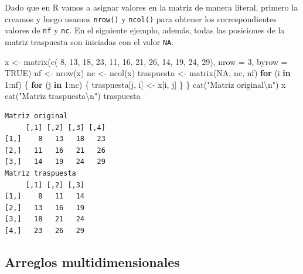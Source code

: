 \documentclass[
]{book}
\newenvironment{Shaded}{\begin{snugshade}}{\end{snugshade}}
\newcommand{\AttributeTok}[1]{\textcolor[rgb]{0.77,0.63,0.00}{#1}}
\newcommand{\ConstantTok}[1]{\textcolor[rgb]{0.00,0.00,0.00}{#1}}
\newcommand{\ControlFlowTok}[1]{\textcolor[rgb]{0.13,0.29,0.53}{\textbf{#1}}}
\newcommand{\DecValTok}[1]{\textcolor[rgb]{0.00,0.00,0.81}{#1}}
\newcommand{\FunctionTok}[1]{\textcolor[rgb]{0.00,0.00,0.00}{#1}}
\newcommand{\NormalTok}[1]{#1}
\newcommand{\OtherTok}[1]{\textcolor[rgb]{0.56,0.35,0.01}{#1}}
\newcommand{\SpecialCharTok}[1]{\textcolor[rgb]{0.00,0.00,0.00}{#1}}
\newcommand{\StringTok}[1]{\textcolor[rgb]{0.31,0.60,0.02}{#1}}
\begin{document}
Dado que en R vamos a asignar valores en la matriz de manera literal, primero la creamos y luego usamos \texttt{nrow()} y \texttt{ncol()} para obtener los correspondientes valores de \texttt{nf} y \texttt{nc}. En el siguiente ejemplo, además, todas las posiciones de la matriz traspuesta son iniciadas con el valor \texttt{NA}.

\begin{Shaded}
\begin{Highlighting}[]
\NormalTok{x }\OtherTok{\textless{}{-}} \FunctionTok{matrix}\NormalTok{(}\FunctionTok{c}\NormalTok{( }\DecValTok{8}\NormalTok{, }\DecValTok{13}\NormalTok{, }\DecValTok{18}\NormalTok{, }\DecValTok{23}\NormalTok{, }
              \DecValTok{11}\NormalTok{, }\DecValTok{16}\NormalTok{, }\DecValTok{21}\NormalTok{, }\DecValTok{26}\NormalTok{, }
              \DecValTok{14}\NormalTok{, }\DecValTok{19}\NormalTok{, }\DecValTok{24}\NormalTok{, }\DecValTok{29}\NormalTok{), }
            \AttributeTok{nrow =} \DecValTok{3}\NormalTok{, }\AttributeTok{byrow =} \ConstantTok{TRUE}\NormalTok{)}
\NormalTok{nf }\OtherTok{\textless{}{-}} \FunctionTok{nrow}\NormalTok{(x)}
\NormalTok{nc }\OtherTok{\textless{}{-}} \FunctionTok{ncol}\NormalTok{(x)}
\NormalTok{traspuesta }\OtherTok{\textless{}{-}} \FunctionTok{matrix}\NormalTok{(}\ConstantTok{NA}\NormalTok{, nc, nf)}
\ControlFlowTok{for}\NormalTok{ (i }\ControlFlowTok{in} \DecValTok{1}\SpecialCharTok{:}\NormalTok{nf) \{}
    \ControlFlowTok{for}\NormalTok{ (j }\ControlFlowTok{in} \DecValTok{1}\SpecialCharTok{:}\NormalTok{nc) \{}
\NormalTok{        traspuesta[j, i] }\OtherTok{\textless{}{-}}\NormalTok{ x[i, j]}
\NormalTok{    \}}
\NormalTok{\}}
\FunctionTok{cat}\NormalTok{(}\StringTok{"Matriz original}\SpecialCharTok{\textbackslash{}n}\StringTok{"}\NormalTok{)}
\NormalTok{x}
\FunctionTok{cat}\NormalTok{(}\StringTok{"Matriz traspuesta}\SpecialCharTok{\textbackslash{}n}\StringTok{"}\NormalTok{)}
\NormalTok{traspuesta}
\end{Highlighting}
\end{Shaded}

\begin{verbatim}
Matriz original
     [,1] [,2] [,3] [,4]
[1,]    8   13   18   23
[2,]   11   16   21   26
[3,]   14   19   24   29
Matriz traspuesta
     [,1] [,2] [,3]
[1,]    8   11   14
[2,]   13   16   19
[3,]   18   21   24
[4,]   23   26   29
\end{verbatim}

\hypertarget{arreglos-multidimensionales}{%
\subsection{Arreglos multidimensionales}\label{arreglos-multidimensionales}}
\end{document}
